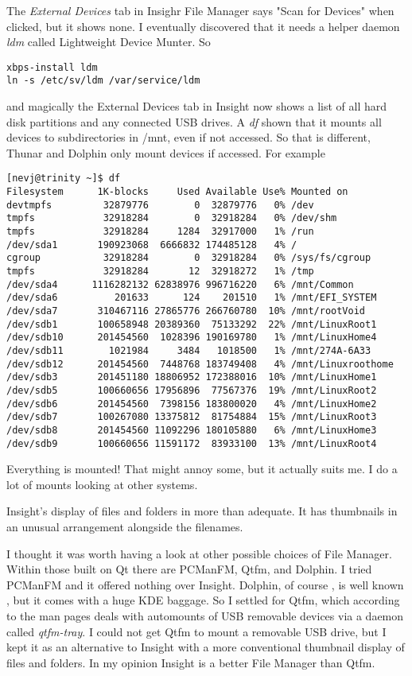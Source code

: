 \documentclass{article}  %
\begin{document}
{The {\em External Devices} tab in Insighr File Manager says "Scan for Devices" when clicked, but it shows none. I eventually discovered that it needs a helper daemon {\em ldm} called Lightweight Device Munter. So
\begin{verbatim}
xbps-install ldm
ln -s /etc/sv/ldm /var/service/ldm
\end{verbatim}
and magically the External Devices tab in Insight now shows a list of all hard disk partitions and any connected USB drives. A {\em df} shown that it mounts all devices to subdirectories in /mnt, even if not accessed. So that is different, Thunar and Dolphin only mount devices if accessed. For example
\begin{verbatim}
[nevj@trinity ~]$ df
Filesystem      1K-blocks     Used Available Use% Mounted on
devtmpfs         32879776        0  32879776   0% /dev
tmpfs            32918284        0  32918284   0% /dev/shm
tmpfs            32918284     1284  32917000   1% /run
/dev/sda1       190923068  6666832 174485128   4% /
cgroup           32918284        0  32918284   0% /sys/fs/cgroup
tmpfs            32918284       12  32918272   1% /tmp
/dev/sda4      1116282132 62838976 996716220   6% /mnt/Common
/dev/sda6          201633      124    201510   1% /mnt/EFI_SYSTEM
/dev/sda7       310467116 27865776 266760780  10% /mnt/rootVoid
/dev/sdb1       100658948 20389360  75133292  22% /mnt/LinuxRoot1
/dev/sdb10      201454560  1028396 190169780   1% /mnt/LinuxHome4
/dev/sdb11        1021984     3484   1018500   1% /mnt/274A-6A33
/dev/sdb12      201454560  7448768 183749408   4% /mnt/Linuxroothome
/dev/sdb3       201451180 18806952 172388016  10% /mnt/LinuxHome1
/dev/sdb5       100660656 17956896  77567376  19% /mnt/LinuxRoot2
/dev/sdb6       201454560  7398156 183800020   4% /mnt/LinuxHome2
/dev/sdb7       100267080 13375812  81754884  15% /mnt/LinuxRoot3
/dev/sdb8       201454560 11092296 180105880   6% /mnt/LinuxHome3
/dev/sdb9       100660656 11591172  83933100  13% /mnt/LinuxRoot4
\end{verbatim}
Everything is mounted!  That might annoy some, but it actually suits me. I do a lot of mounts looking at other systems.

 Insight's display of files and folders in more than adequate. It has thumbnails in an unusual arrangement alongside the filenames.

I thought it was worth having a look at other possible choices of File Manager. Within those built on Qt there are PCManFM, Qtfm, and Dolphin. I tried PCManFM and it offered nothing over Insight. Dolphin, of course , is well known , but it comes with a huge KDE baggage. So I settled for Qtfm, which according to the man pages deals with automounts of USB removable devices via a daemon called {\em qtfm-tray}. I could not get Qtfm to mount a removable USB drive, but I kept it as an alternative to Insight with a more conventional thumbnail display of files and folders.  In my opinion Insight is a better File Manager than Qtfm.

}
\end{document}
